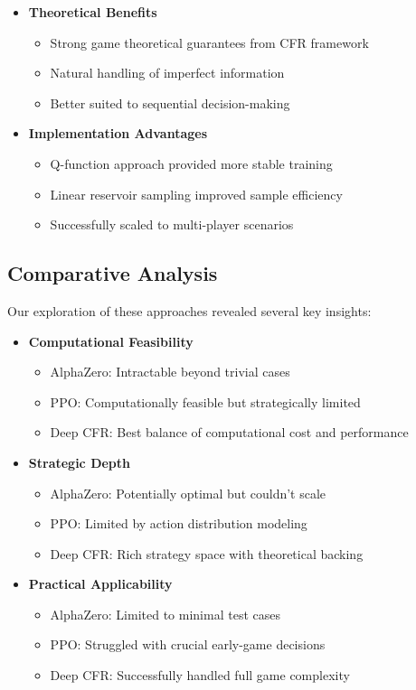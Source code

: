 \documentclass[11pt]{article}
\begin{document}
\begin{itemize}
    \item \textbf{Theoretical Benefits}
    \begin{itemize}
        \item Strong game theoretical guarantees from CFR framework
        \item Natural handling of imperfect information
        \item Better suited to sequential decision-making
    \end{itemize}
    
    \item \textbf{Implementation Advantages}
    \begin{itemize}
        \item Q-function approach provided more stable training
        \item Linear reservoir sampling improved sample efficiency
        \item Successfully scaled to multi-player scenarios
    \end{itemize}
\end{itemize}

\subsection{Comparative Analysis}
Our exploration of these approaches revealed several key insights:

\begin{itemize}
    \item \textbf{Computational Feasibility}
    \begin{itemize}
        \item AlphaZero: Intractable beyond trivial cases
        \item PPO: Computationally feasible but strategically limited
        \item Deep CFR: Best balance of computational cost and performance
    \end{itemize}
    
    \item \textbf{Strategic Depth}
    \begin{itemize}
        \item AlphaZero: Potentially optimal but couldn't scale
        \item PPO: Limited by action distribution modeling
        \item Deep CFR: Rich strategy space with theoretical backing
    \end{itemize}
    
    \item \textbf{Practical Applicability}
    \begin{itemize}
        \item AlphaZero: Limited to minimal test cases
        \item PPO: Struggled with crucial early-game decisions
        \item Deep CFR: Successfully handled full game complexity
    \end{itemize}
\end{itemize}
\end{document}
